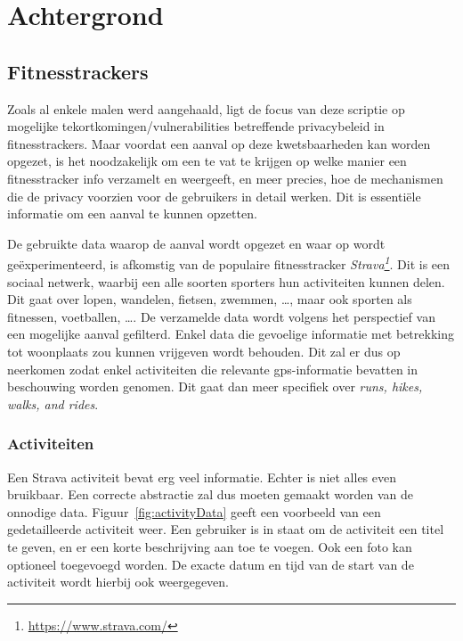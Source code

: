 
\chapter{Achtergrond}

\section{Fitnesstrackers}
Zoals al enkele malen werd aangehaald, ligt de focus van deze scriptie op
mogelijke tekortkomingen/vulnerabilities betreffende privacybeleid in
fitnesstrackers. Maar voordat een aanval op deze kwetsbaarheden kan worden
opgezet, is het noodzakelijk om een te vat te krijgen op welke manier een
fitnesstracker info verzamelt en weergeeft, en meer precies, hoe de mechanismen
die de privacy voorzien voor de gebruikers in detail werken. Dit is essentiële
informatie om een aanval te kunnen opzetten.

De gebruikte data waarop de aanval wordt opgezet en waar op wordt
geëxperimenteerd, is afkomstig van de populaire fitnesstracker
\textit{Strava\footnote{\url{https://www.strava.com/}}}. Dit is een sociaal
netwerk, waarbij een alle soorten sporters hun activiteiten kunnen delen. Dit
gaat over lopen, wandelen, fietsen, zwemmen, \ldots, maar ook sporten als
fitnessen, voetballen, \ldots. De verzamelde data wordt volgens het perspectief
van een mogelijke aanval gefilterd. Enkel data die gevoelige informatie met
betrekking tot woonplaats zou kunnen vrijgeven wordt behouden. Dit zal er dus
op neerkomen zodat enkel activiteiten die relevante gps-informatie bevatten in
beschouwing worden genomen. Dit gaat dan meer specifiek over \textit{runs,
    hikes, walks, and rides}.

\subsection{Activiteiten}\label{data}
Een Strava activiteit bevat erg veel informatie. Echter is niet alles even
bruikbaar. Een correcte abstractie zal dus moeten gemaakt worden van de
onnodige data. Figuur~\ref{fig:activityData} geeft een voorbeeld van een
gedetailleerde activiteit weer. Een gebruiker is in staat om de activiteit een
titel te geven, en er een korte beschrijving aan toe te voegen. Ook een foto
kan optioneel toegevoegd worden. De exacte datum en tijd van de start van de
activiteit wordt hierbij ook weergegeven.

